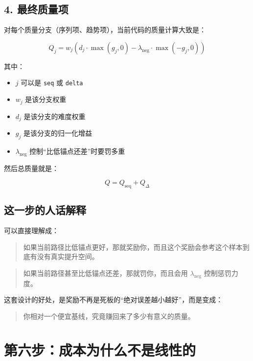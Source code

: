 \documentclass[12pt]{ctexart}
\begin{document}
\subsection{4. 最终质量项}

对每个质量分支（序列项、趋势项），当前代码的质量计算大致是：

\begin{equation}
    Q_j = w_j \left(d_j \cdot \max(g_j, 0) - \lambda_{\text{neg}} \cdot \max(-g_j, 0)\right)
\end{equation}

其中：

\begin{itemize}
    \item $j$ 可以是 \texttt{seq} 或 \texttt{delta}
    \item $w_j$ 是该分支权重
    \item $d_j$ 是该分支的难度权重
    \item $g_j$ 是该分支的归一化增益
    \item $\lambda_{\text{neg}}$ 控制“比低锚点还差”时要罚多重
\end{itemize}

然后总质量就是：

\begin{equation}
    Q = Q_{\text{seq}} + Q_{\Delta}
\end{equation}

\subsection{这一步的人话解释}

可以直接理解成：

\begin{quote}
    如果当前路径比低锚点更好，那就奖励你，而且这个奖励会参考这个样本到底有没有真实提升空间。
\end{quote}

\begin{quote}
    如果当前路径甚至比低锚点还差，那就罚你，而且会用 $\lambda_{\text{neg}}$ 控制惩罚力度。
\end{quote}

这套设计的好处，是奖励不再是死板的“绝对误差越小越好”，而是变成：

\begin{quote}
    你相对一个便宜基线，究竟赚回来了多少有意义的质量。
\end{quote}

\section{第六步：成本为什么不是线性的}
\end{document}
